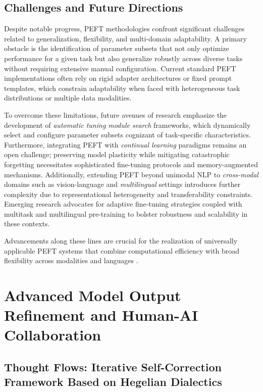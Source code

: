 \documentclass[11pt]{article}
\begin{document}
\subsection{Challenges and Future Directions}

Despite notable progress, PEFT methodologies confront significant challenges related to generalization, flexibility, and multi-domain adaptability. A primary obstacle is the identification of parameter subsets that not only optimize performance for a given task but also generalize robustly across diverse tasks without requiring extensive manual configuration. Current standard PEFT implementations often rely on rigid adapter architectures or fixed prompt templates, which constrain adaptability when faced with heterogeneous task distributions or multiple data modalities. 

To overcome these limitations, future avenues of research emphasize the development of \textit{automatic tuning module search} frameworks, which dynamically select and configure parameter subsets cognizant of task-specific characteristics. Furthermore, integrating PEFT with \textit{continual learning} paradigms remains an open challenge; preserving model plasticity while mitigating catastrophic forgetting necessitates sophisticated fine-tuning protocols and memory-augmented mechanisms. Additionally, extending PEFT beyond unimodal NLP to \textit{cross-modal} domains such as vision-language and \textit{multilingual} settings introduces further complexity due to representational heterogeneity and transferability constraints. Emerging research advocates for adaptive fine-tuning strategies coupled with multitask and multilingual pre-training to bolster robustness and scalability in these contexts. 

Advancements along these lines are crucial for the realization of universally applicable PEFT systems that combine computational efficiency with broad flexibility across modalities and languages \cite{ref48}.


\section{Advanced Model Output Refinement and Human-AI Collaboration}

\subsection{Thought Flows: Iterative Self-Correction Framework Based on Hegelian Dialectics}
\end{document}
